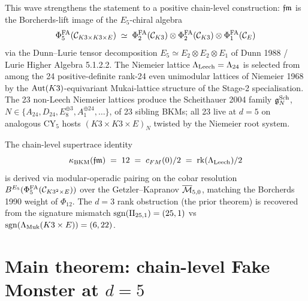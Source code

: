 This wave strengthens the statement to a positive chain-level
construction: $\mathfrak{fm}$ is the Borcherds-lift image of the $E_5$-chiral
algebra
\[
  \Phi^{\mathrm{FA}}_5(\mathcal C_{K3 \times K3 \times E})
  \;\simeq\;
  \Phi^{\mathrm{FA}}_2(\mathcal C_{K3}) \otimes \Phi^{\mathrm{FA}}_2(\mathcal C_{K3})
  \otimes \Phi^{\mathrm{FA}}_1(\mathcal C_E)
\]
via the Dunn--Lurie tensor decomposition $E_5 \simeq E_2 \otimes E_2
\otimes E_1$ of Dunn 1988 / Lurie Higher Algebra 5.1.2.2. The
Niemeier lattice $\Lambda_{\mathrm{Leech}} = \Lambda_{24}$ is selected from among the
24 positive-definite rank-24 even unimodular lattices of Niemeier
1968 by the $\mathrm{Aut}(K3)$-equivariant Mukai-lattice structure of the
Stage-2 specialisation. The 23 non-Leech Niemeier lattices produce
the Scheithauer 2004 family $\mathfrak{g}^{\mathrm{Sch}}_N$, $N \in \{A_{24}, D_{24},
E_8^{\oplus 3}, A_1^{\oplus 24}, \ldots\}$, of 23 sibling BKMs; all
23 live at $d = 5$ on analogous CY$_5$ hosts
$(K3 \times K3 \times E)_N$ twisted by the Niemeier root system.

The chain-level supertrace identity
\[
  \kappa_{\mathrm{BKM}}(\mathfrak{fm}) \;=\; 12
  \;=\; c_{FM}(0)/2
  \;=\; \mathrm{rk}(\Lambda_{\mathrm{Leech}})/2
\]
is derived via modular-operadic pairing on the cobar resolution
$B^{E_5}(\Phi^{\mathrm{FA}}_5(\mathcal C_{K3^2 \times E}))$ over the
Getzler--Kapranov $\overline{\mathcal M}_{5,0}$, matching the Borcherds 1990 weight
of $\Phi_{12}$. The $d = 3$ rank obstruction (the prior theorem) is
recovered from the signature mismatch
$\mathrm{sgn}(\mathrm{II}_{25,1}) = (25, 1)$ vs
$\mathrm{sgn}(\Lambda_{\mathrm{Muk}}(K3 \times E)) = (6, 22)$.

\section*{Main theorem: chain-level Fake Monster at $d = 5$}

